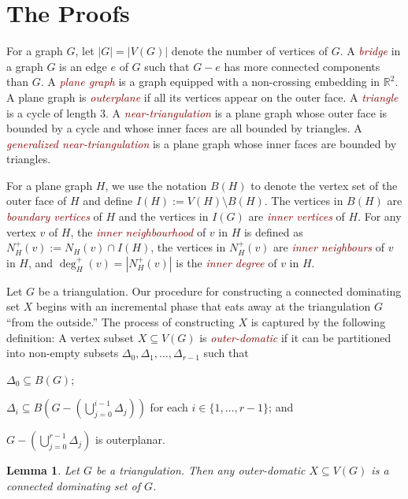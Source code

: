 \documentclass[12pt]{article}
\newtheorem{lem}{Lemma}
\newcommand{\defin}[1]{\emph{\textcolor{Maroon}{#1}}}
\begin{document}
\section{The Proofs}

For a graph $G$, let $|G|=|V(G)|$ denote the number of vertices of $G$.  A \defin{bridge} in a graph $G$ is an edge $e$ of $G$ such that $G-e$ has more connected components than $G$.  A \defin{plane graph} is a graph equipped with a non-crossing embedding in $\mathbb{R}^2$.  A plane graph is \defin{outerplane} if all its vertices appear on the outer face.  A \defin{triangle} is a cycle of length $3$. A \defin{near-triangulation} is a plane graph whose outer face is bounded by a cycle and whose inner faces are all bounded by triangles.  A \defin{generalized near-triangulation} is a plane graph whose inner faces are bounded by triangles.


For a plane graph $H$, we use the notation $B(H)$ to denote the vertex set of the outer face of $H$ and define $I(H):=V(H)\setminus B(H)$.  The vertices in $B(H)$ are \defin{boundary vertices} of $H$ and the vertices in $I(G)$ are \defin{inner vertices} of $H$. For any vertex $v$ of $H$, the \defin{inner neighbourhood} of $v$ in $H$ is defined as $N_H^+(v):=N_H(v)\cap I(H)$, the vertices in $N^+_H(v)$ are \defin{inner neighbours} of $v$ in $H$, and $\deg^+_H(v)=|N^+_H(v)|$ is the \defin{inner degree} of $v$ in $H$.

Let $G$ be a triangulation.  Our procedure for constructing a connected dominating set $X$ begins with an incremental phase that eats away at the triangulation $G$ ``from the outside.'' The process of constructing $X$ is captured by the following definition:   A vertex subset $X\subseteq V(G)$ is \defin{outer-domatic} if it can be partitioned into non-empty subsets $\Delta_0,\Delta_1,\ldots,\Delta_{r-1}$ such that
\begin{compactenum}[(P1)]
    \item $\Delta_0\subseteq B(G)$; \label{outer_face}
    \item $\Delta_i\subseteq B(G-(\bigcup_{j=0}^{i-1}\Delta_j))$ for each $i\in\{1,\ldots,r-1\}$; and \label{incremental}
    \item $G-(\bigcup_{j=0}^{r-1}\Delta_j)$ is outerplanar. \label{outerplanar}
\end{compactenum}

\begin{lem}\label{outer_domatic}
    Let $G$ be a triangulation.  Then any outer-domatic $X\subseteq V(G)$ is a connected dominating set of $G$.
\end{lem}
\end{document}
